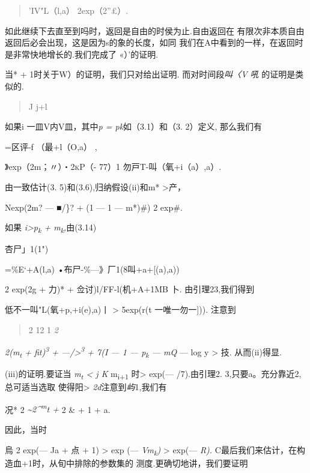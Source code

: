 \documentclass{article}
\begin{document}
\begin{quote}
'IV"L（l,a）\textbar{} 2exp（2''£）.
\end{quote}

如此继续下去直至到吗时，返回是自由的时侯为止.自由返回在
有限次非本质自由返回后必会出现，这是因为s的象的长度，如同
我们在A中看到的一样，在返回时是非常快地增长的.我们完成了 «）'的证明.

当* + 1时关于W）的证明，我们只对给出证明. 而对时间段\emph{叫〈V 吼}
的证明是类似的.

\begin{quote}
J j+l
\end{quote}

如果i 一皿V内V皿，其中\emph{p = pk}如（3.1）和（3. 2）定义, 那么我们有

=区评-f （最+l（O,a） ,

》exp（2m；〃）\textsc{・2kP（-} 77）1
勿戸T-叫（氧+i（a）,a）\textbar{}.

由一致估计(3. 5)和(3.6),归纳假设(ii)和m* \textgreater{}产，

Nexp(2m? --- ■/\}? + (1 --- 1 --- m*)\#) 2 exp\#.

如果 \emph{i\textgreater{}p\textsubscript{k} +
m\textsubscript{k},}由(3.14)

\textbar{}杏尸」1(1")\textbar{}

=\textbar{}\%E`+A(l,a) •布尸-\%---》厂1(8叫+a+{[}(a),a))\textbar{}

2 exp(2g + 力)* + 佥讨)l/FF-l(机+A+1MB 卜. 由引理23,我们得到

低不一叫"L(氧+p,+i(e),a)丨 \textgreater{} 5exp(r(t 一唯一勿一{]})).
注意到

\begin{quote}
2 12 1 \emph{2}
\end{quote}

\emph{2(m\textsubscript{t} + fit)\textsuperscript{3} +
---/\textgreater{}\textsuperscript{3} + 7(I --- 1 --- p\textsubscript{k}
--- mQ} --- log y \textgreater{} 技. 从而(ii)得显.

(iii)的证明.要证当 \emph{m\textsubscript{t} \textless{} j K}
m\textsubscript{i+1} 时\textgreater{} exp(--- /7).由引理2.
3,只要a。充分靠近2,总可适当选取 使得阳\textgreater{}
\emph{2d}注意到\emph{屿}1,我们有

况* 2 \emph{\textasciitilde{}2\^{}\textsuperscript{m}t +} 2 \& + 1 + a.

因此，当时

\textbar{}烏 \textbar{} 2 exp(--- Ja + 点 + 1) \textgreater{} exp (---
\emph{Vm\textsubscript{k})} \textgreater{} exp(--- \emph{R).}
C最后我们来估计，在构造血+1时，从旬中排除的参数集的
测度.更确切地讲，我们要证明
\end{document}
